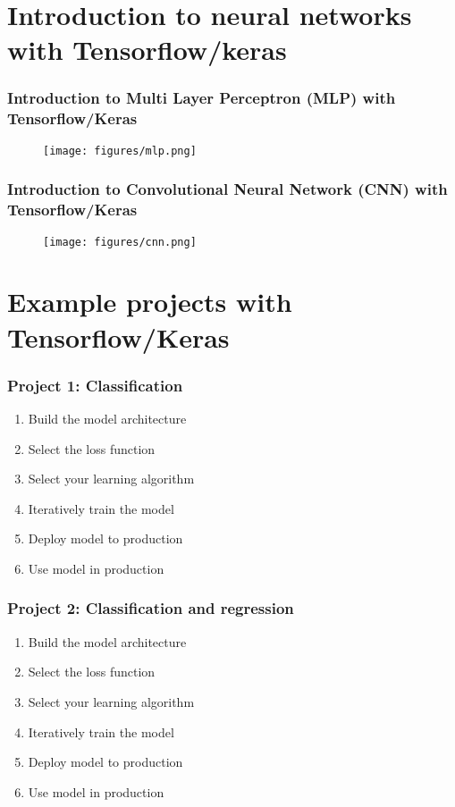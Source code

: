 \documentclass{beamer}
\def\light#1{{\color{light}#1}}
\begin{document}
\section{Introduction to neural networks with Tensorflow/keras} 
\begin{frame}
\frametitle{Introduction to Multi Layer Perceptron (MLP) with Tensorflow/Keras}
\begin{figure}[H] %
   \centering
   \texttt{[image: figures/mlp.png]} 
\end{figure}
\end{frame}

\begin{frame}
\frametitle{Introduction to Convolutional Neural Network (CNN) with Tensorflow/Keras}
\begin{figure}[H] %
   \centering
   \texttt{[image: figures/cnn.png]} 
   \end{figure}
\end{frame}

\section{Example projects with Tensorflow/Keras}
\begin{frame}
\frametitle{Project 1: Classification}
\begin{example}
\begin{enumerate}
\item Build the model architecture 
\item Select the loss function
\item Select your learning algorithm
\item Iteratively train the model
\item \light{Deploy model to production}
\item \light{Use model in production}
\end{enumerate}
\end{example}
\end{frame}

\begin{frame}
\frametitle{Project 2: Classification and regression}
\begin{example}
\begin{enumerate}
\item Build the model architecture 
\item Select the loss function
\item Select your learning algorithm
\item Iteratively train the model
\item \light{Deploy model to production}
\item \light{Use model in production}
\end{enumerate}
\end{example}
\end{frame}
\end{document}

